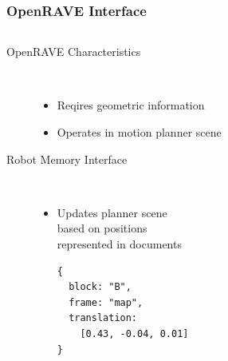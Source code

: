 \begin{frame}[fragile]
  \frametitle{OpenRAVE Interface}
  \begin{columns}
    \begin{column}{0.6\textwidth}
  \begin{description}
  \item[OpenRAVE Characteristics]%
                \hfill \\
    \begin{itemize}
    \item Reqires geometric information
    \item Operates in motion planner scene
    \end{itemize}
  \item[Robot Memory Interface]%
                \hfill \\
    \begin{itemize}
    \item Updates planner scene\\ based on positions\\ represented in documents
\begin{lstlisting}[style=SmallJSON,
  framexleftmargin=5pt, xleftmargin=0pt,linewidth=5cm,
 morekeywords={}, numbers=none]
{
  block: "B",
  frame: "map",
  translation:
    [0.43, -0.04, 0.01]
}
\end{lstlisting}
    \end{itemize}
  \end{description}
    \end{column}
    \begin{column}{0.4\textwidth}

\end{column}
\end{columns}
\end{frame}
